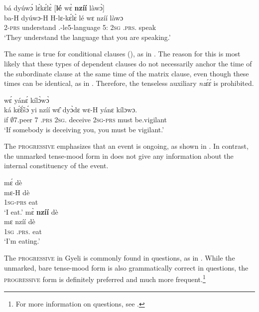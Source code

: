 \ea\label{nzee4}
  \glll bá dyúwɔ́ lɛ́kɛ́lɛ̀ [{\bfseries lé} wɛ̀ {\bfseries nzíí} làwɔ̀]\textsubscript{\REL} \\
        ba-H dyúwɔ-H H-lɛ-kɛ́lɛ̀ {\db}lé wɛ nzíí làwɔ \\
        2-\textsc{prs} understand {\OBJ}.{\LINK}-le5-language {\db}5:{\ATT} 2\textsc{sg} {\PROG}.\textsc{prs}.{\R} speak\\
    \trans `They understand the language that you are speaking.'
\z


\noindent The same is true for conditional clauses (), as in . The reason for this is most likely that these types of dependent clauses do not necessarily anchor the time of the subordinate clause at the same time of the matrix clause, even though these times can be identical, as in . Therefore, the tenseless auxiliary {\itshape nzɛ́ɛ́} is prohibited.

\ea\label{nzee5}
  \textsubscript{\COND} wɛ́ yánɛ́ kílɔ̀wɔ̀ \\
        {\db}ká kɛ̃́ɛ̃́sɔ́ yi nzíí wɛ̂ dyɔ̀dɛ wɛ-H yánɛ kílɔwɔ. \\
         {\db}if $\emptyset$7.peer 7 {\PROG}.\textsc{prs} 2\textsc{sg}.{\OBJ} deceive 2\textsc{sg}-\textsc{prs} must be.vigilant\\
    \trans `If somebody is deceiving you, you must be vigilant.'
\z


The \textsc{progressive} emphasizes that an event is ongoing, as shown in . In contrast, the unmarked tense-mood form in  does not give any information about the internal constituency of the event. 

\ea\label{PRG}
\ea \label{PRG1}
  \glll     mɛ́ dè \\
           mɛ-H dè \\
              1\textsc{sg}-\textsc{prs} eat\\
    \trans `I eat.'
\ex\label{PRG2}
  \glll   mɛ̀ {\bfseries nzíí} dè  \\
          mɛ nzíí dè  \\
              1\textsc{sg} {\PROG}.\textsc{prs}.{\R} eat\\
    \trans `I'm eating.'
\z
\z


The \textsc{progressive} in Gyeli  is commonly found in questions, as in . While the unmarked, bare tense-mood form is also grammatically correct in questions, the \textsc{progressive} form is definitely preferred and much more frequent.\footnote{For more information on questions, see .}

